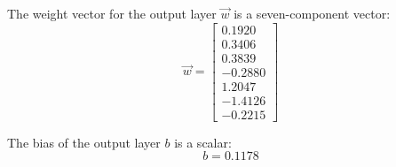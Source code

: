 \documentclass[metals,article,accept,pdftex,moreauthors]{Definitions/mdpi}
\begin{document}
The weight vector for the output layer $\overrightarrow{w}$ is a seven-component vector:
\begin{equation*}
\overrightarrow{w} = \left[
\begin{array}{r}
0.1920 \\
0.3406 \\
0.3839 \\
-0.2880 \\
1.2047 \\
-1.4126 \\
-0.2215
\end{array}\right]
\end{equation*}

The bias of the output layer $b$ is a scalar:
\begin{equation*}
b = 0.1178
\end{equation*}
\end{document}
